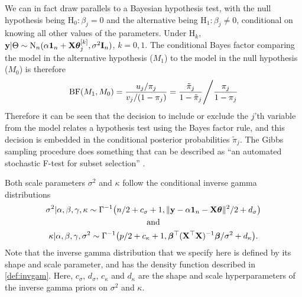 \documentclass[a4paper,showframe,11pt]{report}
\begin{document}
We can in fact draw parallels to a Bayesian hypothesis test, with the null hypothesis being $\text{H}_0: \beta_j = 0$ and the alternative being $\text{H}_1: \beta_j \neq 0$, conditional on knowing all other values of the parameters.
Under $\text{H}_k$, ${\mathbf y}|\Theta \sim\operatorname{N}_n(\alpha {\mathbf 1}_n + {\mathbf X}{\bm\theta}_j^{[k]}, \sigma^2{\mathbf I}_n )$, $k=0,1$. 
The conditional Bayes factor comparing the model in the alternative hypothesis ($M_1$) to the model in the null hypothesis ($M_0$) is therefore
\begin{align*}
  \operatorname{BF}(M_1,M_0) 
  = \frac{u_j/\pi_j}{v_j/(1-\pi_j)} 
  = \frac{\tilde \pi_j  }{1-\tilde \pi_j} \Bigg/ \frac{\pi_j}{ 1-\pi_j }
\end{align*}
Therefore it can be seen that
the decision to include or exclude the $j$'th variable from the model relates a hypothesis test using the Bayes factor rule, and this decision is embedded in the conditional posterior probabilities $\tilde \pi_j$.
The Gibbs sampling procedure does something that can be described as ``an automated stochastic F-test for subset selection'' \citep{Kuo1998}.

Both scale parameters $\sigma^2$ and $\kappa$ follow the conditional inverse gamma distributions
\begin{align*}
  \begin{gathered}
    \sigma^2|\alpha,\beta,\gamma,\kappa \sim \Gamma^{-1}\big(n/2+c_\sigma+1, \Vert {\mathbf y}-\alpha{\mathbf 1}_n-{\mathbf X}{\bm\theta} \Vert^2/2 + d_\sigma \big) \\
    \text{and} \\
    \kappa|\alpha,\beta,\gamma,\sigma^2 \sim \Gamma^{-1}\big(p/2+c_\kappa+1, {\bm\beta}^\top(\mathbf X^\top \mathbf X)^{-1}{\bm\beta}/\sigma^2 + d_\kappa \big). \\
  \end{gathered}
\end{align*}
Note that the inverse gamma distribution that we specify here is defined by its shape and scale parameter, and has the density function described in \cref{def:invgam}.
Here, $c_\sigma$, $d_\sigma$, $c_\kappa$ and $d_\kappa$ are the shape and scale hyperparameters of the inverse gamma priors on $\sigma^2$ and $\kappa$.
\end{document}
